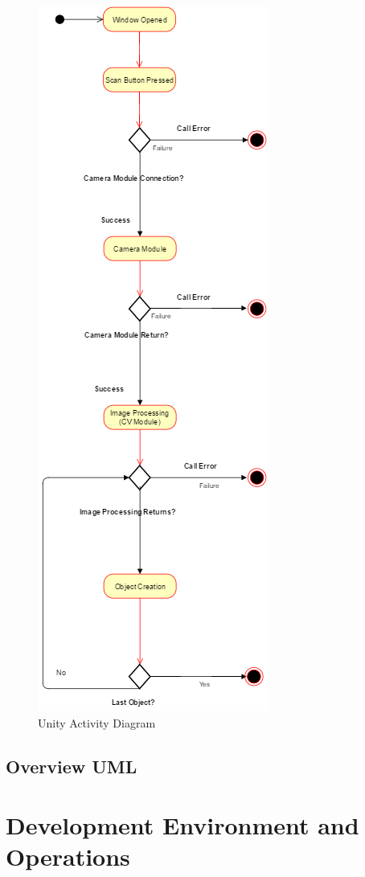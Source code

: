 \documentclass[12pt]{article}
\begin{document}
\begin{figure}
\centering
\includegraphics{Figures/unityActivityDiagram.png}
\caption{Unity Activity Diagram}
\end{figure}

\subsection{Overview UML}\label{overview-uml}

\section{Development Environment and
Operations}\label{development-environment-and-operations}
\end{document}
